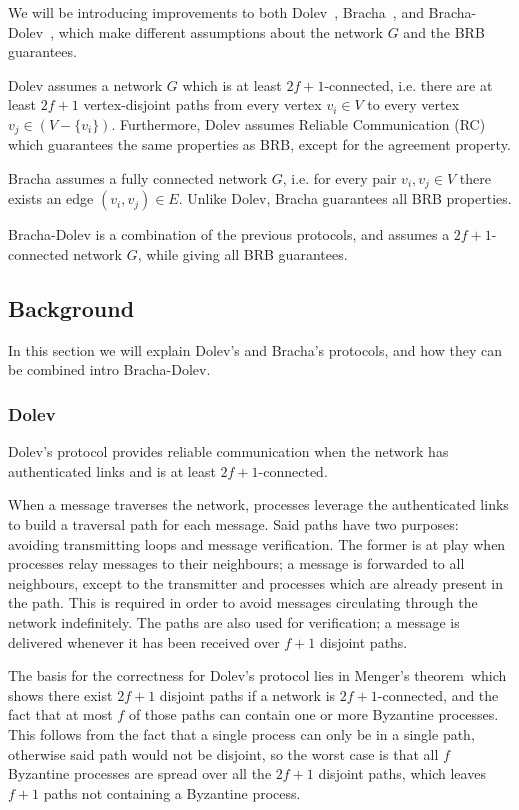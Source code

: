 We will be introducing improvements to both Dolev~\cite{dolev}, Bracha~\cite{bracha}, and Bracha-Dolev~\cite{bracha-dolev}, which make different assumptions about the network $G$ and the BRB guarantees.

Dolev assumes a network $G$ which is at least $2f+1$-connected, i.e. there are at least $2f+1$ vertex-disjoint paths from every vertex $v_i \in V$ to every vertex $v_j \in (V - \{v_i\})$. Furthermore, Dolev assumes Reliable Communication (RC) which guarantees the same properties as BRB, except for the agreement property.

Bracha assumes a fully connected network $G$, i.e. for every pair $v_i,v_j \in V$ there exists an edge $(v_i, v_j) \in E$. Unlike Dolev, Bracha guarantees all BRB properties.

Bracha-Dolev is a combination of the previous protocols, and assumes a $2f+1$-connected network $G$, while giving all BRB guarantees.

\subsection*{Background}
In this section we will explain Dolev's and Bracha's protocols, and how they can be combined intro Bracha-Dolev.

\subsubsection{Dolev}
Dolev's protocol provides reliable communication when the network has authenticated links and is at least $2f+1$-connected.

When a message traverses the network, processes leverage the authenticated links to build a traversal path for each message. Said paths have two purposes: avoiding transmitting loops and message verification. 
The former is at play when processes relay messages to their neighbours; a message is forwarded to all neighbours, except to the transmitter and processes which are already present in the path. This is required in order to avoid messages circulating through the network indefinitely.
The paths are also used for verification; a message is delivered whenever it has been received over $f+1$ disjoint paths.

The basis for the correctness for Dolev's protocol lies in Menger's theorem~\citationneeded which shows there exist $2f+1$ disjoint paths if a network is $2f+1$-connected, and the fact that at most $f$ of those paths can contain one or more Byzantine processes. This follows from the fact that a single process can only be in a single path, otherwise said path would not be disjoint, so the worst case is that all $f$ Byzantine processes are spread over all the $2f+1$ disjoint paths, which leaves $f+1$ paths not containing a Byzantine process.

